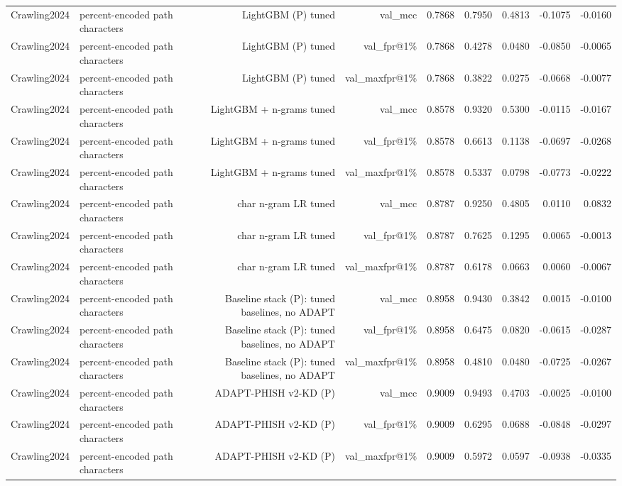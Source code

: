 \begin{table}[t]
\begin{tabular}{llrrrrrrr}
Crawling2024 & percent-encoded path characters & LightGBM (P) tuned & val\_mcc & 0.7868 & 0.7950 & 0.4813 & -0.1075 & -0.0160 \\
Crawling2024 & percent-encoded path characters & LightGBM (P) tuned & val\_fpr@1\% & 0.7868 & 0.4278 & 0.0480 & -0.0850 & -0.0065 \\
Crawling2024 & percent-encoded path characters & LightGBM (P) tuned & val\_maxfpr@1\% & 0.7868 & 0.3822 & 0.0275 & -0.0668 & -0.0077 \\
Crawling2024 & percent-encoded path characters & LightGBM + n-grams tuned & val\_mcc & 0.8578 & 0.9320 & 0.5300 & -0.0115 & -0.0167 \\
Crawling2024 & percent-encoded path characters & LightGBM + n-grams tuned & val\_fpr@1\% & 0.8578 & 0.6613 & 0.1138 & -0.0697 & -0.0268 \\
Crawling2024 & percent-encoded path characters & LightGBM + n-grams tuned & val\_maxfpr@1\% & 0.8578 & 0.5337 & 0.0798 & -0.0773 & -0.0222 \\
Crawling2024 & percent-encoded path characters & char n-gram LR tuned & val\_mcc & 0.8787 & 0.9250 & 0.4805 & 0.0110 & 0.0832 \\
Crawling2024 & percent-encoded path characters & char n-gram LR tuned & val\_fpr@1\% & 0.8787 & 0.7625 & 0.1295 & 0.0065 & -0.0013 \\
Crawling2024 & percent-encoded path characters & char n-gram LR tuned & val\_maxfpr@1\% & 0.8787 & 0.6178 & 0.0663 & 0.0060 & -0.0067 \\
Crawling2024 & percent-encoded path characters & Baseline stack (P): tuned baselines, no ADAPT & val\_mcc & 0.8958 & 0.9430 & 0.3842 & 0.0015 & -0.0100 \\
Crawling2024 & percent-encoded path characters & Baseline stack (P): tuned baselines, no ADAPT & val\_fpr@1\% & 0.8958 & 0.6475 & 0.0820 & -0.0615 & -0.0287 \\
Crawling2024 & percent-encoded path characters & Baseline stack (P): tuned baselines, no ADAPT & val\_maxfpr@1\% & 0.8958 & 0.4810 & 0.0480 & -0.0725 & -0.0267 \\
Crawling2024 & percent-encoded path characters & ADAPT-PHISH v2-KD (P) & val\_mcc & 0.9009 & 0.9493 & 0.4703 & -0.0025 & -0.0100 \\
Crawling2024 & percent-encoded path characters & ADAPT-PHISH v2-KD (P) & val\_fpr@1\% & 0.9009 & 0.6295 & 0.0688 & -0.0848 & -0.0297 \\
Crawling2024 & percent-encoded path characters & ADAPT-PHISH v2-KD (P) & val\_maxfpr@1\% & 0.9009 & 0.5972 & 0.0597 & -0.0938 & -0.0335 \\

\end{tabular}
\end{table}
